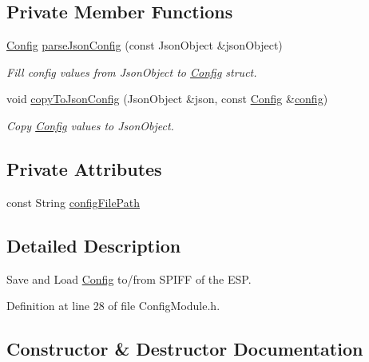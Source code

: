 \subsection*{Private Member Functions}
\begin{DoxyCompactItemize}
\item 
\mbox{\hyperlink{struct_config}{Config}} \mbox{\hyperlink{class_config_module_a937d05a9dd8761526d35b648d5823030}{parse\+Json\+Config}} (const Json\+Object \&json\+Object)
\begin{DoxyCompactList}\small\item\em Fill config values from Json\+Object to \mbox{\hyperlink{struct_config}{Config}} struct. \end{DoxyCompactList}\item 
void \mbox{\hyperlink{class_config_module_a19014d9b2ce8d8dee2333a52886d86d8}{copy\+To\+Json\+Config}} (Json\+Object \&json, const \mbox{\hyperlink{struct_config}{Config}} \&\mbox{\hyperlink{main_8cpp_a4a8dd3a2de125b72d4fe6251a0a271b5}{config}})
\begin{DoxyCompactList}\small\item\em Copy \mbox{\hyperlink{struct_config}{Config}} values to Json\+Object. \end{DoxyCompactList}\end{DoxyCompactItemize}
\subsection*{Private Attributes}
\begin{DoxyCompactItemize}
\item 
const String \mbox{\hyperlink{class_config_module_a0738d7b1088e75c5503a894e88d439aa}{config\+File\+Path}}
\end{DoxyCompactItemize}


\subsection{Detailed Description}
Save and Load \mbox{\hyperlink{struct_config}{Config}} to/from S\+P\+I\+FF of the E\+SP. 

Definition at line 28 of file Config\+Module.\+h.



\subsection{Constructor \& Destructor Documentation}
\mbox{\label{class_config_module_a0f7c95e0a768a56c7f4ff835b09657b2}} 
